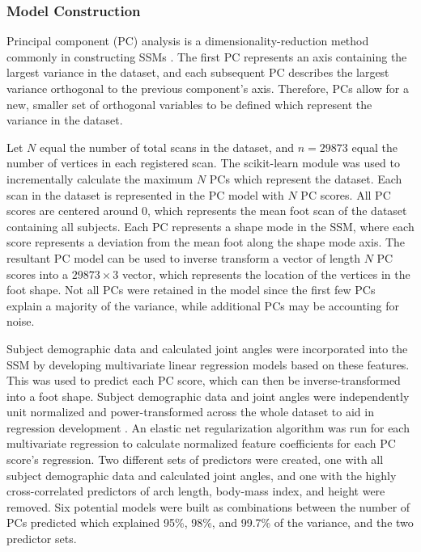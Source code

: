 \documentclass[defaultstyle,11pt]{thesis}
\begin{document}
\hypertarget{model-construction}{%
\subsubsection{Model Construction}\label{model-construction}}

Principal component (PC) analysis is a dimensionality-reduction method commonly in constructing SSMs \citep{Reed2008, Park2015a, Conrad2019, Stankovic2020}.
The first PC represents an axis containing the largest variance in the dataset, and each subsequent PC describes the largest variance orthogonal to the previous component's axis.
Therefore, PCs allow for a new, smaller set of orthogonal variables to be defined which represent the variance in the dataset.

Let \(N\) equal the number of total scans in the dataset, and \(n=29873\) equal the number of vertices in each registered scan. The scikit-learn module \citep{JMLR:v12:pedregosa11a} was used to incrementally calculate the maximum \(N\) PCs which represent the dataset.
Each scan in the dataset is represented in the PC model with \(N\) PC scores.
All PC scores are centered around 0, which represents the mean foot scan of the dataset containing all subjects.
Each PC represents a shape mode in the SSM, where each score represents a deviation from the mean foot along the shape mode axis. The resultant PC model can be used to inverse transform a vector of length \(N\) PC scores into a \(29873\times 3\) vector, which represents the location of the vertices in the foot shape. Not all PCs were retained in the model since the first few PCs explain a majority of the variance, while additional PCs may be accounting for noise.

Subject demographic data and calculated joint angles were incorporated into the SSM by developing multivariate linear regression models based on these features.
This was used to predict each PC score, which can then be inverse-transformed into a foot shape.
Subject demographic data and joint angles were independently unit normalized and power-transformed across the whole dataset to aid in regression development \citep{Yeo2000}.
An elastic net regularization algorithm \citep{Zou2005} was run for each multivariate regression to calculate normalized feature coefficients for each PC score's regression.
Two different sets of predictors were created, one with all subject demographic data and calculated joint angles, and one with the highly cross-correlated predictors of arch length, body-mass index, and height were removed.
Six potential models were built as combinations between the number of PCs predicted which explained 95\%, 98\%, and 99.7\% of the variance, and the two predictor sets.
\end{document}
